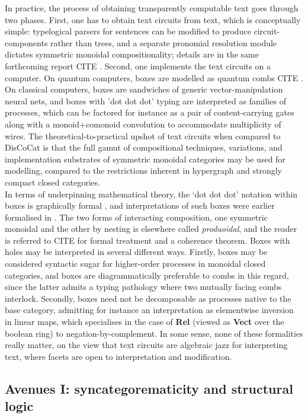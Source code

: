 In practice, the process of obtaining transparently computable text goes through two phases. First, one has to obtain text circuits from text, which is conceptually simple: typelogical parsers for sentences can be modified to produce circuit-components rather than trees, and a separate pronomial resolution module dictates symmetric monoidal compositionality; details are in the same forthcoming report \bR CITE \e. Second, one implements the text circuits on a computer. On quantum computers, boxes are modelled as quantum combs \bR CITE \e. On classical computers, boxes are sandwiches of generic vector-manipulation neural nets, and boxes with 'dot dot dot' typing are interpreted as families of processes, which can be factored for instance as a pair of content-carrying gates along with a monoid+comonoid convolution to accommodate multiplicity of wires. The theoretical-to-practical upshot of text circuits when compared to DisCoCat is that the full gamut of compositional techniques, variations, and implementation substrates of symmetric monoidal categories may be used for modelling, compared to the restrictions inherent in hypergraph and strongly compact closed categories.\\

In terms of underpinning mathematical theory, the `dot dot dot' notation within boxes is graphically formal \citep{wilson_string_2022}, and interpretations of such boxes were earlier formalised in \citep{merry_reasoning_2014,quick_-logic_2015,zamdzhiev_rewriting_2017}. The two forms of interacting composition, one symmetric monoidal and the other by nesting is elsewhere called \emph{produoidal}, and the reader is referred to \bR CITE \e for formal treatment and a coherence theorem. Boxes with holes may be interpreted in several different ways. Firstly, boxes may be considered syntactic sugar for higher-order processes in monoidal closed categories, and boxes are diagrammatically preferable to combs in this regard, since the latter admits a typing pathology where two mutually facing combs interlock. Secondly, boxes need not be decomposable as processes native to the base category, admitting for instance an interpretation as elementwise inversion in linear maps, which specialises in the case of \textbf{Rel} (viewed as \textbf{Vect} over the boolean ring) to negation-by-complement. In some sense, none of these formalities really matter, on the view that text circuits are algebraic jazz for interpreting text, where facets are open to interpretation and modification.

\subsection{Avenues I: syncategorematicity and structural logic}

